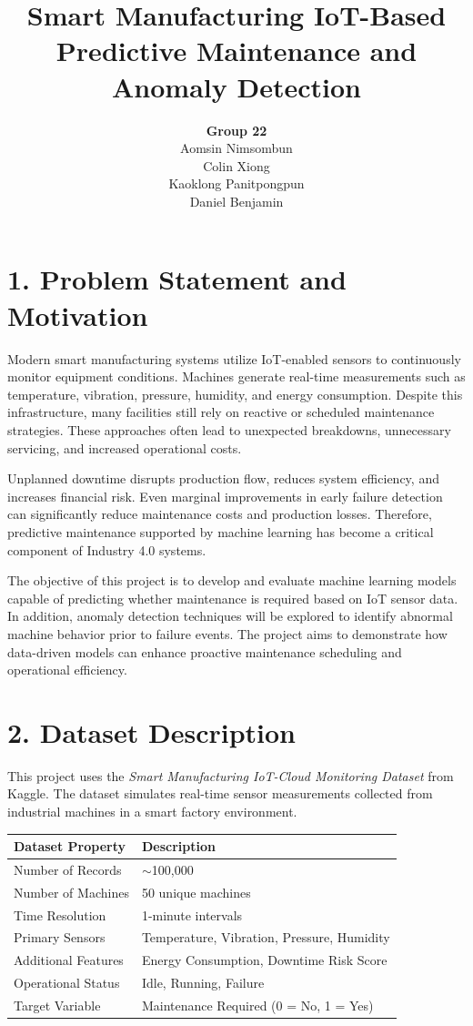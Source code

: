 \documentclass[12pt]{article}
\title{\textbf{Smart Manufacturing IoT-Based Predictive Maintenance and Anomaly Detection}}
\author{
\textbf{Group 22} \\
Aomsin Nimsombun \\
Colin Xiong \\
Kaoklong Panitpongpun \\
Daniel Benjamin
}
\date{}
\begin{document}
\maketitle

\section*{1. Problem Statement and Motivation}

Modern smart manufacturing systems utilize IoT-enabled sensors to continuously monitor equipment conditions. Machines generate real-time measurements such as temperature, vibration, pressure, humidity, and energy consumption. Despite this infrastructure, many facilities still rely on reactive or scheduled maintenance strategies. These approaches often lead to unexpected breakdowns, unnecessary servicing, and increased operational costs.

Unplanned downtime disrupts production flow, reduces system efficiency, and increases financial risk. Even marginal improvements in early failure detection can significantly reduce maintenance costs and production losses. Therefore, predictive maintenance supported by machine learning has become a critical component of Industry 4.0 systems.

The objective of this project is to develop and evaluate machine learning models capable of predicting whether maintenance is required based on IoT sensor data. In addition, anomaly detection techniques will be explored to identify abnormal machine behavior prior to failure events. The project aims to demonstrate how data-driven models can enhance proactive maintenance scheduling and operational efficiency.

\section*{2. Dataset Description}

This project uses the \textit{Smart Manufacturing IoT-Cloud Monitoring Dataset} from Kaggle. The dataset simulates real-time sensor measurements collected from industrial machines in a smart factory environment.

\begin{table}[ht]
\centering
\begin{tabular}{ll}
\toprule
\textbf{Dataset Property} & \textbf{Description} \\
\midrule
Number of Records & $\sim$100,000 \\
Number of Machines & 50 unique machines \\
Time Resolution & 1-minute intervals \\
Primary Sensors & Temperature, Vibration, Pressure, Humidity \\
Additional Features & Energy Consumption, Downtime Risk Score \\
Operational Status & Idle, Running, Failure \\
Target Variable & Maintenance Required (0 = No, 1 = Yes) \\
\bottomrule
\end{tabular}
\end{table}
\end{document}
